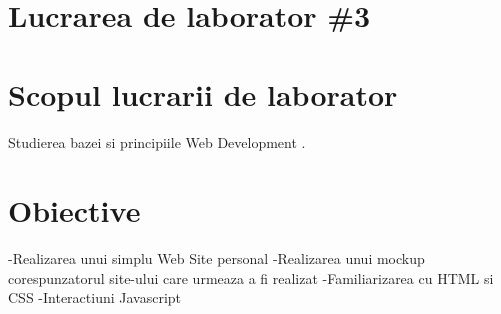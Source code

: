 
\section*{Lucrarea de laborator \#3}




\section{Scopul lucrarii de laborator}

Studierea bazei si principiile Web Development  .

\section{Obiective}


-Realizarea unui simplu Web Site personal
-Realizarea unui mockup corespunzatorul site-ului care urmeaza a fi realizat
-Familiarizarea cu HTML si CSS
-Interactiuni Javascript

       
